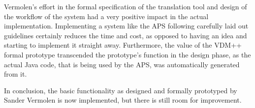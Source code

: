 \documentclass[]{article}
\begin{document}
Vermolen's effort in the formal specification of the translation tool and design of the workflow of the system had a very positive impact in the actual implementation.
Implementing a system like the APS following carefully laid out guidelines certainly reduces the time and cost, as opposed to having an idea and starting to implement it straight away.
Furthermore, the value of the VDM++ formal prototype transcended the prototype's function in the design phase, as the actual Java code, that is being used by the APS, was automatically generated from it.

In conclusion, the basic functionality as designed and formally prototyped by Sander Vermolen is now implemented, but there is still room for improvement.



\end{document}
